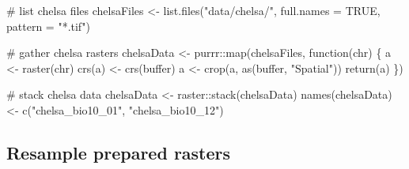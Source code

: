 \documentclass[]{article}
\newenvironment{Shaded}{}{}
\newcommand{\CommentTok}[1]{\textcolor[rgb]{0.00,0.50,0.00}{#1}}
\newcommand{\ControlFlowTok}[1]{\textcolor[rgb]{0.00,0.00,1.00}{#1}}
\newcommand{\DataTypeTok}[1]{#1}
\newcommand{\DecValTok}[1]{#1}
\newcommand{\KeywordTok}[1]{\textcolor[rgb]{0.00,0.00,1.00}{#1}}
\newcommand{\NormalTok}[1]{#1}
\newcommand{\OperatorTok}[1]{#1}
\newcommand{\OtherTok}[1]{\textcolor[rgb]{1.00,0.25,0.00}{#1}}
\newcommand{\StringTok}[1]{\textcolor[rgb]{0.00,0.50,0.50}{#1}}
\begin{document}
\begin{Shaded}
\begin{Highlighting}[numbers=left,,]
\CommentTok{# list chelsa files}
\NormalTok{chelsaFiles <-}\StringTok{ }\KeywordTok{list.files}\NormalTok{(}\StringTok{"data/chelsa/"}\NormalTok{, }\DataTypeTok{full.names =} \OtherTok{TRUE}\NormalTok{, }\DataTypeTok{pattern =} \StringTok{"*.tif"}\NormalTok{)}

\CommentTok{# gather chelsa rasters}
\NormalTok{chelsaData <-}\StringTok{ }\NormalTok{purrr}\OperatorTok{::}\KeywordTok{map}\NormalTok{(chelsaFiles, }\ControlFlowTok{function}\NormalTok{(chr) \{}
\NormalTok{  a <-}\StringTok{ }\KeywordTok{raster}\NormalTok{(chr)}
  \KeywordTok{crs}\NormalTok{(a) <-}\StringTok{ }\KeywordTok{crs}\NormalTok{(buffer)}
\NormalTok{  a <-}\StringTok{ }\KeywordTok{crop}\NormalTok{(a, }\KeywordTok{as}\NormalTok{(buffer, }\StringTok{"Spatial"}\NormalTok{))}
  \KeywordTok{return}\NormalTok{(a)}
\NormalTok{\})}

\CommentTok{# stack chelsa data}
\NormalTok{chelsaData <-}\StringTok{ }\NormalTok{raster}\OperatorTok{::}\KeywordTok{stack}\NormalTok{(chelsaData)}
\KeywordTok{names}\NormalTok{(chelsaData) <-}\StringTok{ }\KeywordTok{c}\NormalTok{(}\StringTok{"chelsa_bio10_01"}\NormalTok{, }\StringTok{"chelsa_bio10_12"}\NormalTok{)}
\end{Highlighting}
\end{Shaded}

\hypertarget{resample-prepared-rasters}{%
\subsection{Resample prepared rasters}\label{resample-prepared-rasters}}

\begin{Shaded}
\end{Shaded}
\end{document}
